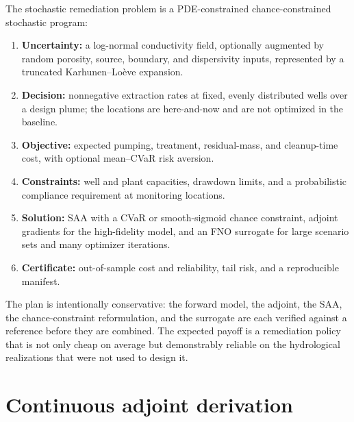 \documentclass[11pt]{article}
\numberwithin{equation}{section}
\theoremstyle{plain}
\begin{document}
The stochastic remediation problem is a PDE-constrained chance-constrained
stochastic program:
\begin{enumerate}[leftmargin=1.6em,itemsep=2pt]
  \item \textbf{Uncertainty:} a log-normal conductivity field, optionally
        augmented by random porosity, source, boundary, and dispersivity
        inputs, represented by a truncated Karhunen--Lo\`eve expansion.
  \item \textbf{Decision:} nonnegative extraction rates at fixed, evenly
        distributed wells over a design plume; the locations are here-and-now
        and are not optimized in the baseline.
  \item \textbf{Objective:} expected pumping, treatment, residual-mass, and
        cleanup-time cost, with optional mean--CVaR risk aversion.
  \item \textbf{Constraints:} well and plant capacities, drawdown limits, and
        a probabilistic compliance requirement at monitoring locations.
  \item \textbf{Solution:} SAA with a CVaR or smooth-sigmoid chance
        constraint, adjoint gradients for the high-fidelity model, and an FNO
        surrogate for large scenario sets and many optimizer iterations.
  \item \textbf{Certificate:} out-of-sample cost and reliability, tail risk,
        and a reproducible manifest.
\end{enumerate}
The plan is intentionally conservative: the forward model, the adjoint, the
SAA, the chance-constraint reformulation, and the surrogate are each verified
against a reference before they are combined.  The expected payoff is a
remediation policy that is not only cheap on average but demonstrably reliable
on the hydrological realizations that were not used to design it.

\appendix

\section{Continuous adjoint derivation}
\label{app:adjoint}
\end{document}
